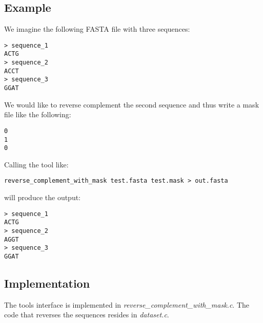 \subsection{Example}
We imagine the following FASTA file with three sequences:
\begin{lstlisting}
> sequence_1
ACTG
> sequence_2
ACCT
> sequence_3
GGAT
\end{lstlisting}
We would like to reverse complement the second sequence and thus
write a mask file like the following:
\begin{lstlisting}
0
1
0
\end{lstlisting}
Calling the tool like:
\begin{lstlisting}
reverse_complement_with_mask test.fasta test.mask > out.fasta
\end{lstlisting}
will produce the output:
\begin{lstlisting}
> sequence_1
ACTG
> sequence_2
AGGT
> sequence_3
GGAT
\end{lstlisting}

\subsection{Implementation}
The tools interface is implemented in \emph{reverse\_complement\_with\_mask.c}.
The code that reverses the sequences resides in \emph{dataset.c}.
